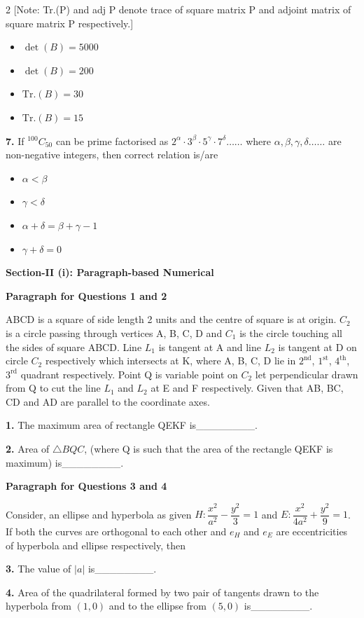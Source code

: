 \documentclass[10pt]{extarticle}
\newenvironment{qoptions}{\begin{itemize}[leftmargin=1.8em,itemsep=2pt,topsep=2pt,label={}]}{\end{itemize}}
\newcommand{\opt}[2]{\item[({#1})] {#2}}
\newcommand{\subsectionhdr}[1]{\par\vspace{3pt}\noindent\textbf{#1}\par\vspace{2pt}}
\begin{document}
\begin{multicols}{2}
[Note: Tr.(P) and adj P denote trace of square matrix P and adjoint matrix of square matrix P respectively.]

\begin{qoptions}
\opt{A}{$\det(B)=5000$}
\opt{B}{$\det(B)=200$}
\opt{C}{$\text{Tr.}(B)=30$}
\opt{D}{$\text{Tr.}(B)=15$}
\end{qoptions}

\textbf{7.} If $^{100}C_{50}$ can be prime factorised as $2^\alpha\cdot3^\beta\cdot5^\gamma\cdot7^\delta\ldots\ldots$ where $\alpha,\beta,\gamma,\delta\ldots\ldots$ are non-negative integers, then correct relation is/are

\begin{qoptions}
\opt{A}{$\alpha<\beta$}
\opt{B}{$\gamma<\delta$}
\opt{C}{$\alpha+\delta=\beta+\gamma-1$}
\opt{D}{$\gamma+\delta=0$}
\end{qoptions}

\subsectionhdr{Section-II (i): Paragraph-based Numerical}

\textbf{Paragraph for Questions 1 and 2}

ABCD is a square of side length 2 units and the centre of square is at origin. $C_2$ is a circle passing through vertices A, B, C, D and $C_1$ is the circle touching all the sides of square ABCD. Line $L_1$ is tangent at A and line $L_2$ is tangent at D on circle $C_2$ respectively which intersects at K, where A, B, C, D lie in $2^{\text{nd}}$, $1^{\text{st}}$, $4^{\text{th}}$, $3^{\text{rd}}$ quadrant respectively. Point Q is variable point on $C_2$ let perpendicular drawn from Q to cut the line $L_1$ and $L_2$ at E and F respectively. Given that AB, BC, CD and AD are parallel to the coordinate axes.

\textbf{1.} The maximum area of rectangle QEKF is\_\_\_\_\_\_\_\_.

\textbf{2.} Area of $\triangle BQC$, (where Q is such that the area of the rectangle QEKF is maximum) is\_\_\_\_\_\_\_\_.

\textbf{Paragraph for Questions 3 and 4}

Consider, an ellipse and hyperbola as given $H:\dfrac{x^2}{a^2}-\dfrac{y^2}3=1$ and $E:\dfrac{x^2}{4a^2}+\dfrac{y^2}9=1$. If both the curves are orthogonal to each other and $e_H$ and $e_E$ are eccentricities of hyperbola and ellipse respectively, then

\textbf{3.} The value of $|a|$ is\_\_\_\_\_\_\_\_.

\textbf{4.} Area of the quadrilateral formed by two pair of tangents drawn to the hyperbola from $(1,0)$ and to the ellipse from $(5,0)$ is\_\_\_\_\_\_\_\_.


\end{multicols}
\end{document}
